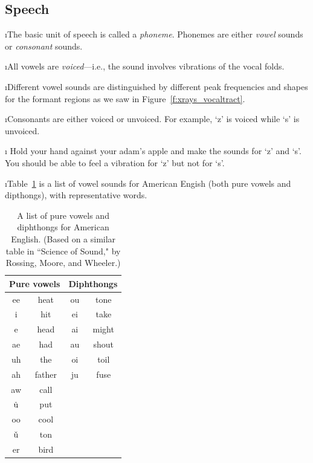 \ei
\subsection{Speech}
\bi

\i The basic unit of speech is called a {\em phoneme}.
Phonemes are either {\em vowel} sounds or {\em consonant} 
sounds.

\i All vowels are {\em voiced}---i.e., the sound
involves vibrations of the vocal folds.

\i Different vowel sounds are distinguished by 
different peak frequencies and shapes for the formant regions
as we saw in Figure~\ref{f:xrays_vocaltract}.

\i Consonants are either voiced or unvoiced.
For example, `z' is voiced while `s' is unvoiced.

\i \demo
Hold your hand against your adam's apple and make
the sounds for `z' and `s'.
You should be able to feel a vibration for `z' but
not for `s'.

\i Table~\ref{t:vowels} is a list of vowel sounds for
American Engish (both pure vowels and dipthongs), 
with representative words.
%
\begin{table}[htbp]
\begin{center}
\begin{tabular}{|c|c|c|c|}
\hline
\multicolumn{2}{|c|}{Pure vowels}
& \multicolumn{2}{|c|}{Diphthongs} 
\\
\hline
ee & heat & ou & tone \\
i & hit & ei & take \\
e & head & ai & might \\
ae & had & au & shout \\
uh & the & oi & toil \\
ah & father & ju & fuse \\
aw & call & & \\
$\dot{\rm u}$ & put & & \\
oo & cool & & \\
$\check{\rm u}$ & ton & & \\
er & bird & & \\
\hline
\end{tabular}
\caption{A list of pure vowels and diphthongs for 
American English.
(Based on a similar table in
``Science of Sound," by Rossing, Moore, and Wheeler.)}
\label{t:vowels}
\end{center}
\end{table}

